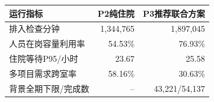 \begin{tabular}{lrr}
\toprule
运行指标 & P2纯住院 & P3推荐联合方案 \\
\midrule
排入检查分钟 & 1,344,765 & 1,897,045 \\
人员在岗容量利用率 & 54.53\% & 76.93\% \\
住院等待P95/小时 & 23.67 & 25.58 \\
多项目需求跨室率 & 58.16\% & 30.63\% \\
背景全期下限/完成数 & -- & 43,221/54,137 \\
\bottomrule
\end{tabular}
